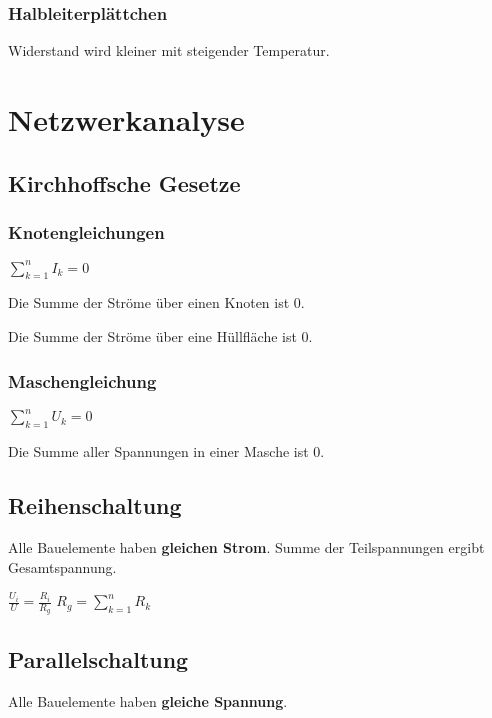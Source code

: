 \documentclass[10pt,a4paper]{scrartcl}
\begin{document}
\begin{multicols*}{3}
	\subsubsection{Halbleiterplättchen}
	Widerstand wird kleiner mit steigender Temperatur.
	
	\section{Netzwerkanalyse}
	\subsection{Kirchhoffsche Gesetze}
	\subsubsection{Knotengleichungen}
	
	$\sum_{k=1}^n{I_k}=0$
	
	Die Summe der Ströme über einen Knoten ist 0.
	
	Die Summe der Ströme über eine Hüllfläche ist 0.	
	
	
	\columnbreak
	
	\subsubsection{Maschengleichung}
	
	$\sum_{k=1}^n{U_k}=0$
	
	Die Summe aller Spannungen in einer Masche ist 0.
	
	
	 	
	
	\subsection{Reihenschaltung}
	
	Alle Bauelemente haben \textbf{gleichen Strom}. Summe der Teilspannungen ergibt Gesamtspannung.
	
	$\frac{U_i}{U}=\frac{R_i}{R_g}$ \hfill $R_g = \sum_{k=1}^n{R_k}$

	 	
	
	\subsection{Parallelschaltung}
	
	Alle Bauelemente haben \textbf{gleiche Spannung}.	
	

\end{multicols*}
\end{document}
